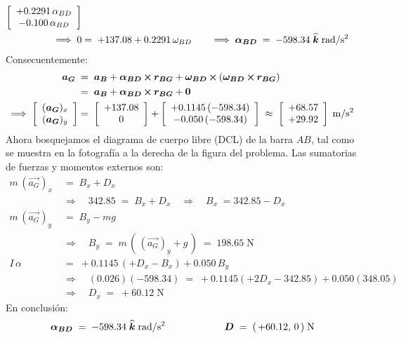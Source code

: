 \documentclass[ a4paper, twoside, 11pt]{article}
\begin{document}
\begin{problem}
\begin{align*}
\left[ \begin{array}{c}  +0.2291 \, \alpha_{BD} \\  -0.100 \, \alpha_{BD} \end{array} \right] \\
\Longrightarrow \; 0 & = \; +137.08 + 0.2291 \, \omega_{BD} \qquad
\Longrightarrow \; {\boldsymbol{\alpha_{BD}}} \; = \; -598.34 \; {\boldsymbol{\widehat{k}}} \; \text{rad/s\ensuremath{^{\text{2}}}}
\end{align*}
Consecuentemente: 
\begin{align*}
{\boldsymbol{a_G}} \;
& = \; {\boldsymbol{a_B}} + {\boldsymbol{\alpha_{BD}}} \,{\boldsymbol{\times}}\, {\boldsymbol{r_{BG}}} + {\boldsymbol{\omega_{BD}}} \,{\boldsymbol{\times}}\, ( {\boldsymbol{\omega_{BD}}} \,{\boldsymbol{\times}}\, {\boldsymbol{r_{BG}}} ) \\
& = \; {\boldsymbol{a_B}} + {\boldsymbol{\alpha_{BD}}} \,{\boldsymbol{\times}}\, {\boldsymbol{r_{BG}}} + {\boldsymbol{0}} \\
\Longrightarrow \; 
\left[ \begin{array}{c}  ({\boldsymbol{a_G}})_x \\  ({\boldsymbol{a_G}})_y \end{array} \right] & =
\; \left[ \begin{array}{c} +137.08 \\ 0 \end{array} \right] +
\left[ \begin{array}{c}  +0.1145 \, (-598.34) \\  -0.050 \, (-598.34) \end{array} \right] \; \approx \; \left[ \begin{array}{c} +68.57 \\ +29.92 \end{array} \right] \; \text{m/s\ensuremath{^{\text{2}}}}
\end{align*}
Ahora bosquejamos el diagrama de cuerpo libre (DCL) de la barra $AB$, tal como se muestra en la fotograf\'ia a la derecha de la figura del problema. Las sumatorias de fuerzas y momentos externos son: 
\begin{align*}
m \, (\vec{a_G})_x \; & = \; B_x + D_x \\
& \Longrightarrow \quad 342.85 \; = \; B_x + D_x
\quad \Longrightarrow \quad B_x \; = 342.85 - D_x \\
m \, (\vec{a_G})_y \; & = \; B_y - mg \\
& \Longrightarrow \quad
B_y \; = \; m \, ( \, (\vec{a_G})_y + g \, )
\; = \; 198.65 \; \text{N} \\
I \, \alpha \; & = \; +0.1145 \, ( +D_x - B_x ) + 0.050 \, B_y \\
& \Longrightarrow \quad
(0.026)(-598.34) \; = \; +0.1145(+2 D_x - 342.85) + 0.050 (348.05) \\
& \Longrightarrow \quad
D_x \; = \; +60.12 \; \text{N}
\end{align*}
En conclusi\'on: 
\[
{\boldsymbol{\alpha_{BD}}} \; = \; -598.34 \; {\boldsymbol{\widehat{k}}} \; \text{rad/s\ensuremath{^{\text{2}}}}
\qquad \qquad \qquad
{\boldsymbol{D}} \; = \; ( \, +60.12, \, 0 \, ) \; \text{N}
\]
\QED

\end{problem}
\fullskip
\end{document}
